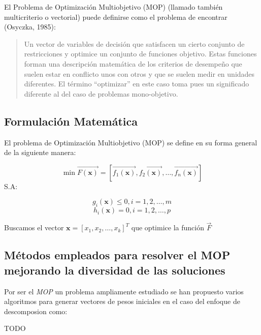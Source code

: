 \documentclass[letterpaper,10pt]{article}
\begin{document}
El Problema de Optimización Multiobjetivo (MOP) (llamado también
multicriterio o vectorial) puede definirse como el problema de
encontrar (Osyczka, 1985)\cite{Osyczka1985193}:
\begin{quote}
Un vector de variables de decisión que satisfacen un cierto
conjunto de restricciones y optimice un conjunto de funciones
objetivo. Estas funciones forman una descripción matemática
de los criterios de desempeño que suelen estar en conflicto
unos con otros y que se suelen medir en unidades diferentes.
El término ``optimizar'' en este caso toma pues un significado
diferente al del caso de problemas mono-objetivo.
\end{quote}

\subsection{Formulación Matemática}
El problema de Optimización Multiobjetivo (MOP) se define en su forma general de la siguiente manera:
 
$$\min \overrightarrow{F(\bm{x})} = \left[ \overrightarrow{f_1(\bm{x})}, \overrightarrow{f_2(\bm{x})} , \dots, \overrightarrow{f_n(\bm{x})} \right] $$
S.A:
 
$$g_i(\bm{x}) \leq 0, i=1,2,\dots,m$$
$$h_i(\bm{x}) = 0, i=1,2,\dots,p$$
 
Buscamos el vector $\bm{x}=[x_1,x_2,\dots,x_k]^T$ que optimice la función $\overrightarrow{F}$

\newpage
 
\subsection{Métodos empleados para resolver el MOP mejorando la diversidad de las soluciones}

Por ser el \emph{MOP} un problema ampliamente estudiado se han propuesto varios algoritmos para generar vectores de pesos iniciales en el caso del enfoque de descomposion como:
\newline

{\huge TODO}
\end{document}
